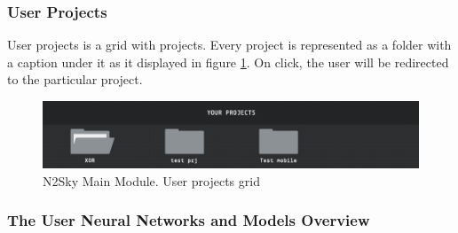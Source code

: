 \subsubsection{User Projects}

User projects is a grid with projects. Every project is represented as a folder with a caption under it as it displayed in figure \ref{fig:n2sky_dashboard_projects}. On click, the user will be redirected to the particular project. 

\begin{figure}[H]
\begin{center}
  \includegraphics[scale=0.5]{components/5/img/n2sky_dashboard_projects.png}
  \caption{N2Sky Main Module. User projects grid}
  \label{fig:n2sky_dashboard_projects}
\end{center}
\end{figure}

 \subsubsection{The User Neural Networks and Models Overview}
 
